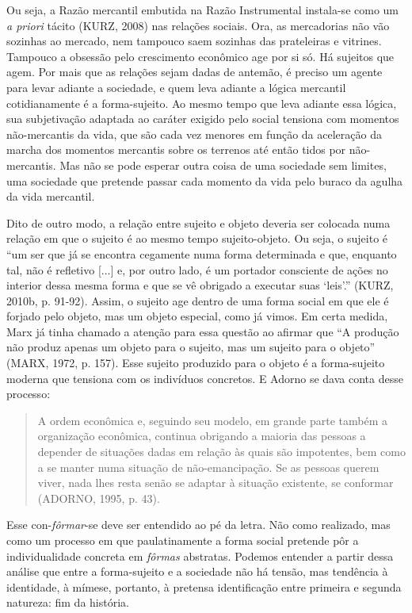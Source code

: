 Ou seja, a Razão mercantil embutida na Razão Instrumental instala-se
como um \emph{a priori} tácito (KURZ, 2008) nas relações sociais. Ora,
as mercadorias não vão sozinhas ao mercado, nem tampouco saem sozinhas
das prateleiras e vitrines. Tampouco a obsessão pelo crescimento
econômico age por si só. Há sujeitos que agem. Por mais que as relações
sejam dadas de antemão, é preciso um agente para levar adiante a
sociedade, e quem leva adiante a lógica mercantil cotidianamente é a
forma-sujeito. Ao mesmo tempo que leva adiante essa lógica, sua
subjetivação adaptada ao caráter exigido pelo social tensiona com
momentos não-mercantis da vida, que são cada vez menores em função da
aceleração da marcha dos momentos mercantis sobre os terrenos até então
tidos por não-mercantis. Mas não se pode esperar outra coisa de uma
sociedade sem limites, uma sociedade que pretende passar cada momento da
vida pelo buraco da agulha da vida mercantil.

Dito de outro modo, a relação entre sujeito e objeto deveria ser
colocada numa relação em que o sujeito é ao mesmo tempo sujeito-objeto.
Ou seja, o sujeito é ``um ser que já se encontra cegamente numa forma
determinada e que, enquanto tal, não é refletivo {[}...{]} e, por outro
lado, é um portador consciente de ações no interior dessa mesma forma e
que se vê obrigado a executar suas `leis'.'' (KURZ, 2010b, p. 91-92).
Assim, o sujeito age dentro de uma forma social em que ele é forjado
pelo objeto, mas um objeto especial, como já vimos. Em certa medida,
Marx já tinha chamado a atenção para essa questão ao afirmar que ``A
produção não produz apenas um objeto para o sujeito, mas um sujeito para
o objeto'' (MARX, 1972, p. 157). Esse sujeito produzido para o objeto é
a forma-sujeito moderna que tensiona com os indivíduos concretos. E
Adorno se dava conta desse processo:

\begin{quote}
A ordem econômica e, seguindo seu modelo, em grande parte também a
organização econômica, continua obrigando a maioria das pessoas a
depender de situações dadas em relação às quais são impotentes, bem como
a se manter numa situação de não-emancipação. Se as pessoas querem
viver, nada lhes resta senão se adaptar à situação existente, se
conformar (ADORNO, 1995, p. 43).
\end{quote}

Esse con-\emph{fôrmar}-se deve ser entendido ao pé da letra. Não como
realizado, mas como um processo em que paulatinamente a forma social
pretende pôr a individualidade concreta em \emph{fôrmas} abstratas.
Podemos entender a partir dessa análise que entre a forma-sujeito e a
sociedade não há tensão, mas tendência à identidade, à mímese, portanto,
à pretensa identificação entre primeira e segunda natureza: fim da
história.

